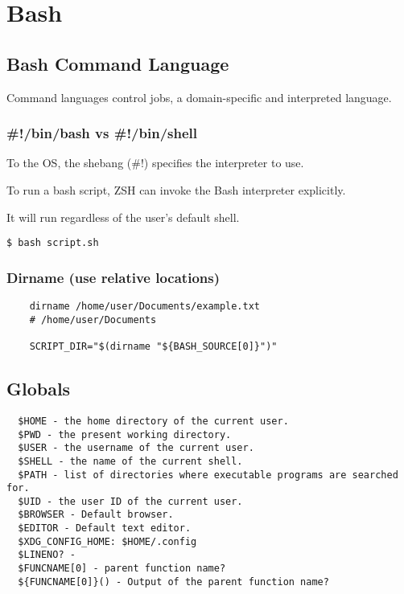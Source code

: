 \chapter{Bash}

\section{Bash Command Language}

Command languages control jobs, a domain-specific and interpreted language.

\subsection{\#!/bin/bash vs \#!/bin/shell}

To the OS, the shebang (\#!) specifies the interpreter to use.

To run a bash script, ZSH can invoke the Bash interpreter explicitly.

It will run regardless of the user's default shell.

\begin{verbatim}
$ bash script.sh
\end{verbatim}

\subsection{Dirname (use relative locations)}
\begin{verbatim}
    dirname /home/user/Documents/example.txt
    # /home/user/Documents

    SCRIPT_DIR="$(dirname "${BASH_SOURCE[0]}")"
\end{verbatim}

\section{Globals}
\begin{verbatim}
  $HOME - the home directory of the current user.
  $PWD - the present working directory.
  $USER - the username of the current user.
  $SHELL - the name of the current shell.
  $PATH - list of directories where executable programs are searched for.
  $UID - the user ID of the current user.
  $BROWSER - Default browser.
  $EDITOR - Default text editor.
  $XDG_CONFIG_HOME: $HOME/.config
  $LINENO? -
  $FUNCNAME[0] - parent function name?
  ${FUNCNAME[0]}() - Output of the parent function name?
\end{verbatim}

